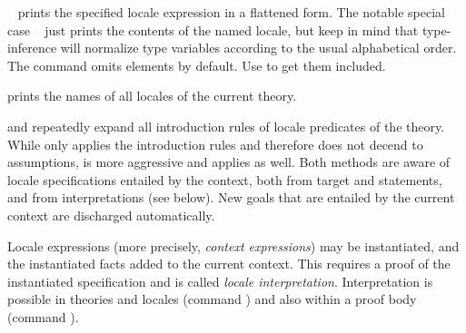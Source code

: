 \begin{isabellebody}
\begin{isamarkuptext}
\begin{descr}
  \item [\hyperlink{command.print_locale}{\mbox{\isa{\isacommand{print{\isacharunderscore}locale}}}}~\isa{{\isachardoublequote}import\ {\isacharplus}\ body{\isachardoublequote}}] prints the
  specified locale expression in a flattened form.  The notable
  special case \hyperlink{command.print_locale}{\mbox{}}~ just prints the
  contents of the named locale, but keep in mind that type-inference
  will normalize type variables according to the usual alphabetical
  order.  The command omits \hyperlink{element.notes}{\mbox{}} elements by default.
  Use \hyperlink{command.print_locale}{\mbox{}}\isa{{\isachardoublequote}{\isacharbang}{\isachardoublequote}} to get them included.

  \item [\hyperlink{command.print_locales}{\mbox{\isa{\isacommand{print{\isacharunderscore}locales}}}}] prints the names of all locales
  of the current theory.

  \item [\hyperlink{method.intro_locales}{\mbox{\isa{intro{\isacharunderscore}locales}}} and \hyperlink{method.unfold_locales}{\mbox{\isa{unfold{\isacharunderscore}locales}}}]
  repeatedly expand all introduction rules of locale predicates of the
  theory.  While \hyperlink{method.intro_locales}{\mbox{}} only applies the  introduction rules and therefore does not decend to
  assumptions, \hyperlink{method.unfold_locales}{\mbox{}} is more aggressive and applies
   as well.  Both methods are aware of locale
  specifications entailed by the context, both from target and
  \hyperlink{element.includes}{\mbox{}} statements, and from interpretations (see
  below).  New goals that are entailed by the current context are
  discharged automatically.

  \end{descr}%
\end{isamarkuptext}%
\isamarkuptrue%
%
\isamarkuptrue%
%
\begin{isamarkuptext}%
Locale expressions (more precisely, \emph{context expressions}) may
  be instantiated, and the instantiated facts added to the current
  context.  This requires a proof of the instantiated specification
  and is called \emph{locale interpretation}.  Interpretation is
  possible in theories and locales (command \hyperlink{command.interpretation}{\mbox{}}) and also within a proof body (command \hyperlink{command.interpret}{\mbox{}}).


\end{isamarkuptext}
\end{isabellebody}
